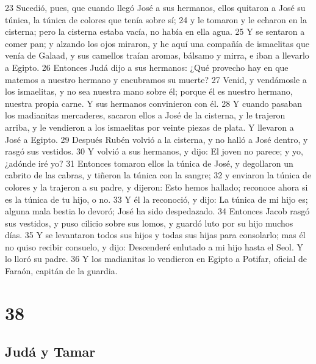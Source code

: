 23 Sucedió, pues, que cuando llegó José a sus hermanos, ellos quitaron a José su túnica, la túnica de colores que tenía sobre sí;
24 y le tomaron y le echaron en la cisterna; pero la cisterna estaba vacía, no había en ella agua.
25 Y se sentaron a comer pan; y alzando los ojos miraron, y he aquí una compañía de ismaelitas que venía de Galaad, y sus camellos traían aromas, bálsamo y mirra, e iban a llevarlo a Egipto.
26 Entonces Judá dijo a sus hermanos: ¿Qué provecho hay en que matemos a nuestro hermano y encubramos su muerte?
27 Venid, y vendámosle a los ismaelitas, y no sea nuestra mano sobre él; porque él es nuestro hermano, nuestra propia carne. Y sus hermanos convinieron con él.
28 Y cuando pasaban los madianitas mercaderes, sacaron ellos a José de la cisterna, y le trajeron arriba, y le vendieron a los ismaelitas por veinte piezas de plata. Y llevaron a José a Egipto.
29 Después Rubén volvió a la cisterna, y no halló a José dentro, y rasgó sus vestidos.
30 Y volvió a sus hermanos, y dijo: El joven no parece; y yo, ¿adónde iré yo?
31 Entonces tomaron ellos la túnica de José, y degollaron un cabrito de las cabras, y tiñeron la túnica con la sangre;
32 y enviaron la túnica de colores y la trajeron a su padre, y dijeron: Esto hemos hallado; reconoce ahora si es la túnica de tu hijo, o no.
33 Y él la reconoció, y dijo: La túnica de mi hijo es; alguna mala bestia lo devoró; José ha sido despedazado.
34 Entonces Jacob rasgó sus vestidos, y puso cilicio sobre sus lomos, y guardó luto por su hijo muchos días.
35 Y se levantaron todos sus hijos y todas sus hijas para consolarlo; mas él no quiso recibir consuelo, y dijo: Descenderé enlutado a mi hijo hasta el Seol. Y lo lloró su padre.
36 Y los madianitas lo vendieron en Egipto a Potifar, oficial de Faraón, capitán de la guardia.

\chapter{38}

\section*{Judá y Tamar}

